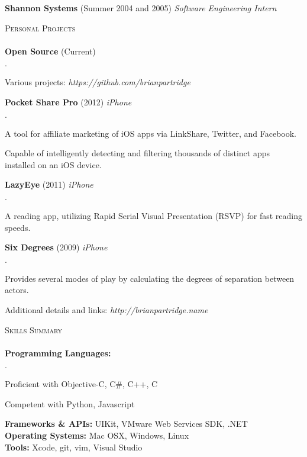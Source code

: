 \documentclass[11pt]{article}
\newcommand{\mydot}{$\cdot$ }
\newcommand{\lineunder}{\vspace*{-8pt} \\ \hspace*{-18pt} \hrulefill \\}
\newcommand{\header}[1]{{\hspace*{-15pt}\vspace*{6pt} \textsc{#1}} \vspace*{-6pt} \lineunder}
\newcommand{\employer}[3]{\textbf{#1} (#2) \emph{#3}\\  }
\newcommand{\project}[3]{\textbf{#1} (#2) \emph{#3}\\  }
\newenvironment{achievements}{\begin{list}{\mydot}{\topsep 0pt \itemsep -2pt}}{\vspace*{4pt}\end{list}}
\begin{document}
\employer{Shannon Systems}{Summer 2004 and 2005}{Software Engineering Intern}
\vspace*{14pt}
  

\header{Personal Projects}
  \project{Open Source}{Current}{}{
  \begin{achievements}
    \item Various projects: \emph{https://github.com/brianpartridge}
  \end{achievements}}
\project{Pocket Share Pro}{2012}{iPhone}{
\begin{achievements}
  \item A tool for affiliate marketing of iOS apps via LinkShare, Twitter, and Facebook.
  \item Capable of intelligently detecting and filtering thousands of distinct apps installed on an iOS device.
\end{achievements}}  
\project{LazyEye}{2011}{iPhone}{
\begin{achievements}
  \item A reading app, utilizing Rapid Serial Visual Presentation (RSVP) for fast reading speeds.
\end{achievements}}
\project{Six Degrees}{2009}{iPhone}{
\begin{achievements}
  \item Provides several modes of play by calculating the degrees of separation between actors.
\end{achievements}}
Additional details and links: \emph{http://brianpartridge.name}\\  
\vspace*{14pt}
  

\header{Skills Summary}
\textbf{Programming Languages:} 
\begin{achievements}
  \item Proficient with Objective-C, C\#, C++, C
  \item Competent with Python, Javascript
\end{achievements}
\vspace{-3pt}

\textbf{Frameworks \& APIs:} UIKit, VMware Web Services SDK, .NET\\

\textbf{Operating Systems:} Mac OSX, Windows, Linux\\

\textbf{Tools:} Xcode, git, vim, Visual Studio\\
\end{document}
